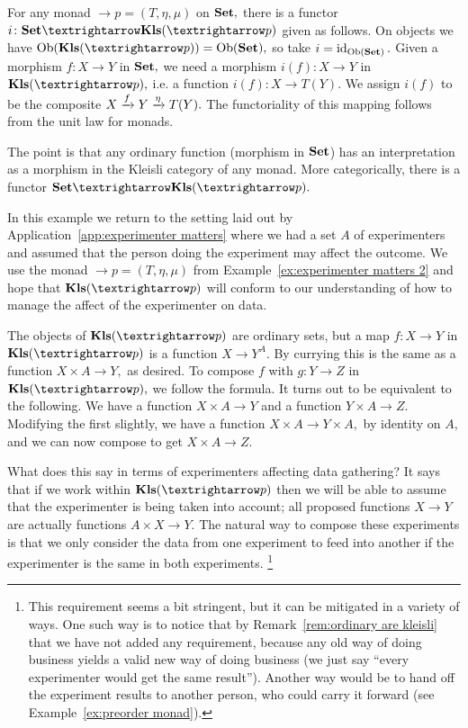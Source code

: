 \documentclass[../main/CT4S-EN-RU]{subfiles}
\begin{document}
\begin{exampleRUS}
\end{exampleRUS}

\begin{remarkENG}\label{rem:ordinary are kleisli}
For any monad ${→}p=(T,\eta,\mu)$ on ${\mathbf{Set}},$ there is a functor $i\colon \Set{→}\Kls({→}p)$ given as follows. On objects we have $\Ob(\Kls({→}p))=\Ob(\Set),$ so take $i=\operatorname{id}_{\operatorname{Ob}({\mathbf{Set}})}.$ Given a morphism $f\colon X{→} Y$ in ${\mathbf{Set}},$ we need a morphism $i(f)\colon X{→} Y$ in $\Kls({→}p),$ i.e. a function $i(f)\colon X{→} T(Y).$ We assign $i(f)$ to be the composite $X\xrightarrow{f}Y\xrightarrow{\eta}T(Y).$ The functoriality of this mapping follows from the unit law for monads.

The point is that any ordinary function (morphism in ${\mathbf{Set}}$) has an interpretation as a morphism in the Kleisli category of any monad. More categorically, there is a functor $\Set{→}\Kls({→}p).$
\end{remarkENG}

\begin{remarkRUS}\label{rem:ordinary are kleisli}
\end{remarkRUS}

\begin{exampleENG}\label{ex:experimenter matters 3}
In this example we return to the setting laid out by Application~\ref{app:experimenter matters} where we had a set $A$ of experimenters and assumed that the person doing the experiment may affect the outcome. We use the monad ${→}p=(T,\eta,\mu)$ from Example~\ref{ex:experimenter matters 2} and hope that $\Kls({→}p)$ will conform to our understanding of how to manage the affect of the experimenter on data.

The objects of $\Kls({→}p)$ are ordinary sets, but a map $f\colon X{→} Y$ in $\Kls({→}p)$ is a function $X{→} Y^A.$ By currying this is the same as a function $X\times A{→} Y,$ as desired. To compose $f$ with $g\colon Y{→} Z$ in $\Kls({→}p),$ we follow the formula. It turns out to be equivalent to the following. We have a function $X\times A{→} Y$ and a function $Y\times A{→} Z.$ Modifying the first slightly, we have a function $X\times A{→} Y\times A,$ by identity on $A,$ and we can now compose to get $X\times A{→} Z.$

What does this say in terms of experimenters affecting data gathering? It says that if we work within $\Kls({→}p)$ then we will be able to assume that the experimenter is being taken into account; all proposed functions $X{→} Y$ are actually functions $A\times X{→} Y.$ The natural way to compose these experiments is that we only consider the data from one experiment to feed into another if the experimenter is the same in both experiments.
\footnote{This requirement seems a bit stringent, but it can be mitigated in a variety of ways. One such way is to notice that by Remark~\ref{rem:ordinary are kleisli} that we have not added any requirement, because any old way of doing business yields a valid new way of doing business (we just say “every experimenter would get the same result”). Another way would be to hand off the experiment results to another person, who could carry it forward (see Example~\ref{ex:preorder monad}).}
\end{exampleENG}
\end{document}
